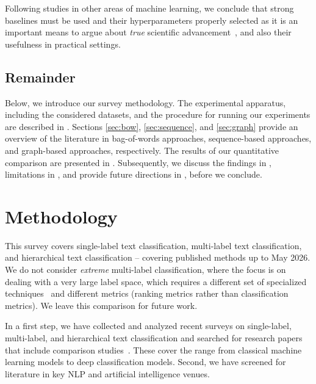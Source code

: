 \documentclass[lettersize,journal]{IEEEtran}
\begin{document}
Following studies in other areas of machine learning, we conclude that strong baselines must be used and their hyperparameters properly selected as it is an important means to argue about \textit{true} scientific advancement~\cite{DBLP:conf/acl/HenaoLCSSWWMZ18,DBLP:conf/recsys/DacremaCJ19}, and also their usefulness in practical settings.

\subsection{Remainder}

Below, we introduce our survey methodology.
The experimental apparatus, including the considered datasets, and the procedure for running our experiments are described in .
Sections \ref{sec:bow}, \ref{sec:sequence}, and \ref{sec:graph} provide an overview of the literature in bag-of-words approaches, sequence-based approaches, and graph-based approaches, respectively.
The results of our quantitative comparison are presented in .
Subsequently, we discuss 
the findings in ,
limitations in ,  and provide future directions in , before we conclude.

\section{Methodology}
\label{sec:methodology}

This survey covers single-label text classification, multi-label text classification, and hierarchical text classification -- covering published methods up to May 2026.
We do not consider \emph{extreme} multi-label classification, where the focus is on dealing with a very large label space, which requires a different set of specialized techniques~\cite{xml0,xml4,xml3,xml2} and different metrics (ranking metrics rather than classification metrics).
We leave this comparison for future work. 

In a first step, we have collected and analyzed recent surveys on single-label, multi-label, and hierarchical text classification and searched for research papers that include comparison studies~\cite{
wang2023graph,
duarte2023review,
buguenoConnectingDotsWhat2023,
DBLP:journals/tist/LiPLXYSYH22,
DBLP:journals/csur/MinaeeKCNCG21,
DBLP:journals/pr/TarekegnGM21,
DBLP:journals/corr/abs-2107-03158,
raihan2021-survey,
DBLP:journals/wias/ZhouGLVTBBK20,
DBLP:conf/esann/QaraeiKB20,
DBLP:journals/corr/abs-2011-11197,
DBLP:journals/information/KowsariMHMBB19,
DBLP:journals/air/Kadhim19,
galkescherp-acl2022,
DBLP:conf/jcdl/MaiGS18,
DBLP:conf/kcap/GalkeMSBS17,
DBLP:conf/sigir/ZhangWYWZ16}.
These cover the range from classical machine learning models to deep classification models.
Second, we have screened for literature in key NLP and artificial intelligence venues.
\end{document}

